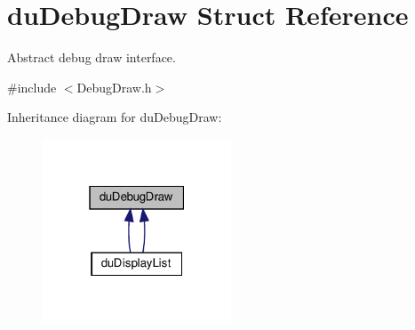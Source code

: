 \hypertarget{structduDebugDraw}{}\section{du\+Debug\+Draw Struct Reference}
\label{structduDebugDraw}


Abstract debug draw interface.  




{\ttfamily \#include $<$Debug\+Draw.\+h$>$}



Inheritance diagram for du\+Debug\+Draw\+:
\nopagebreak
\begin{figure}[H]
\begin{center}
\leavevmode
\includegraphics[width=159pt]{structduDebugDraw__inherit__graph}
\end{center}
\end{figure}
